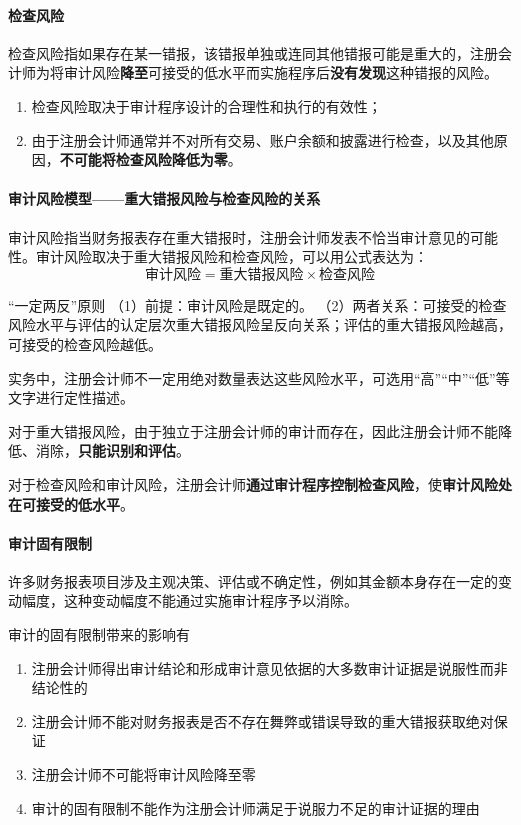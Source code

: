 \documentclass[UTF8,12pt]{ctexart}
\numberwithin{equation}{section} %
\numberwithin{figure}{section}
\numberwithin{table}{section}
\begin{document}
	\paragraph{检查风险}
	检查风险指如果存在某一错报，该错报单独或连同其他错报可能是重大的，注册会计师为将审计风险\textbf{降至}可接受的低水平而实施程序后\textbf{没有发现}这种错报的风险。
	
	\begin{enumerate}
		\item 检查风险取决于审计程序设计的合理性和执行的有效性；
		
		\item 由于注册会计师通常并不对所有交易、账户余额和披露进行检查，以及其他原因，\textbf{不可能将检查风险降低为零}。
	\end{enumerate}

	
	\paragraph{审计风险模型——重大错报风险与检查风险的关系}
	
	审计风险指当财务报表存在重大错报时，注册会计师发表不恰当审计意见的可能性。审计风险取决于重大错报风险和检查风险，可以用公式表达为：
	\begin{equation}
		\text{审计风险} = \text{重大错报风险} \times \text{检查风险}
	\end{equation}
	
	“一定两反”原则
	（1）前提：审计风险是既定的。
	（2）两者关系：可接受的检查风险水平与评估的认定层次重大错报风险呈反向关系；评估的重大错报风险越高，可接受的检查风险越低。
	
	实务中，注册会计师不一定用绝对数量表达这些风险水平，可选用“高”“中”“低”等文字进行定性描述。
	
	对于重大错报风险，由于独立于注册会计师的审计而存在，因此注册会计师不能降低、消除，\textbf{只能识别和评估}。
	
	对于检查风险和审计风险，注册会计师\textbf{通过审计程序控制检查风险}，使\textbf{审计风险处在可接受的低水平}。
	
	\paragraph{审计固有限制}
	许多财务报表项目涉及主观决策、评估或不确定性，例如其金额本身存在一定的变动幅度，这种变动幅度不能通过实施审计程序予以消除。
	
	审计的固有限制带来的影响有
	\begin{enumerate}
		\item 注册会计师得出审计结论和形成审计意见依据的大多数审计证据是说服性而非结论性的
		
		\item 注册会计师不能对财务报表是否不存在舞弊或错误导致的重大错报获取绝对保证
		
		\item 注册会计师不可能将审计风险降至零
		
		\item 审计的固有限制不能作为注册会计师满足于说服力不足的审计证据的理由
	\end{enumerate}
	
\end{document}

